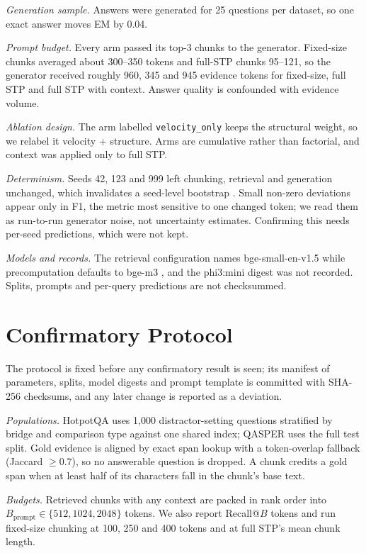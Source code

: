 \documentclass[conference,a4paper]{IEEEtran}
\begin{document}
\textit{Generation sample.} Answers were generated for 25 questions per dataset, so one exact answer moves EM by 0.04.

\textit{Prompt budget.} Every arm passed its top-3 chunks to the generator. Fixed-size chunks averaged about 300--350 tokens and full-STP chunks 95--121, so the generator received roughly 960, 345 and 945 evidence tokens for fixed-size, full STP and full STP with context. Answer quality is confounded with evidence volume.

\textit{Ablation design.} The arm labelled \texttt{velocity\_only} keeps the structural weight, so we relabel it velocity + structure. Arms are cumulative rather than factorial, and context was applied only to full STP.

\textit{Determinism.} Seeds 42, 123 and 999 left chunking, retrieval and generation unchanged, which invalidates a seed-level bootstrap \cite{efron1993bootstrap}. Small non-zero deviations appear only in F1, the metric most sensitive to one changed token; we read them as run-to-run generator noise, not uncertainty estimates. Confirming this needs per-seed predictions, which were not kept.

\textit{Models and records.} The retrieval configuration names bge-small-en-v1.5 \cite{xiao2023cpack} while precomputation defaults to bge-m3 \cite{chen2024bgem3}, and the phi3:mini \cite{abdin2024phi3} digest was not recorded. Splits, prompts and per-query predictions are not checksummed.

\section{Confirmatory Protocol}
\label{sec:protocol}

The protocol is fixed before any confirmatory result is seen; its manifest of parameters, splits, model digests and prompt template is committed with SHA-256 checksums, and any later change is reported as a deviation.

\textit{Populations.} HotpotQA uses 1,000 distractor-setting questions stratified by bridge and comparison type against one shared index; QASPER uses the full test split. Gold evidence is aligned by exact span lookup with a token-overlap fallback (Jaccard $\ge0.7$), so no answerable question is dropped. A chunk credits a gold span when at least half of its characters fall in the chunk's base text.

\textit{Budgets.} Retrieved chunks with any context are packed in rank order into $B_{\mathrm{prompt}}\in\{512,1024,2048\}$ tokens. We also report Recall@$B$ tokens and run fixed-size chunking at 100, 250 and 400 tokens and at full STP's mean chunk length.
\end{document}
